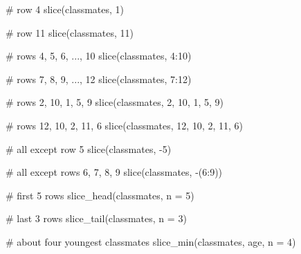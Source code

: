 \documentclass[
  letterpaper,
  DIV=11,
  numbers=noendperiod]{scrreprt}
\newenvironment{Shaded}{\begin{snugshade}}{\end{snugshade}}
\newcommand{\AttributeTok}[1]{\textcolor[rgb]{0.40,0.45,0.13}{#1}}
\newcommand{\CommentTok}[1]{\textcolor[rgb]{0.37,0.37,0.37}{#1}}
\newcommand{\DecValTok}[1]{\textcolor[rgb]{0.68,0.00,0.00}{#1}}
\newcommand{\FunctionTok}[1]{\textcolor[rgb]{0.28,0.35,0.67}{#1}}
\newcommand{\NormalTok}[1]{\textcolor[rgb]{0.00,0.23,0.31}{#1}}
\newcommand{\SpecialCharTok}[1]{\textcolor[rgb]{0.37,0.37,0.37}{#1}}
\begin{document}
\begin{tcolorbox}[enhanced jigsaw, colbacktitle=quarto-callout-tip-color!10!white, opacitybacktitle=0.6, breakable, left=2mm, leftrule=.75mm, toprule=.15mm, toptitle=1mm, bottomtitle=1mm, colframe=quarto-callout-tip-color-frame, opacityback=0, coltitle=black, arc=.35mm, titlerule=0mm, colback=white, bottomrule=.15mm, title=\textcolor{quarto-callout-tip-color}{\faLightbulb}\hspace{0.5em}{Answer}, rightrule=.15mm]

\begin{Shaded}
\begin{Highlighting}[]
\CommentTok{\# row 4}
\FunctionTok{slice}\NormalTok{(classmates, }\DecValTok{1}\NormalTok{)}

\CommentTok{\# row 11}
\FunctionTok{slice}\NormalTok{(classmates, }\DecValTok{11}\NormalTok{)}

\CommentTok{\# rows 4, 5, 6, ..., 10}
\FunctionTok{slice}\NormalTok{(classmates, }\DecValTok{4}\SpecialCharTok{:}\DecValTok{10}\NormalTok{)}

\CommentTok{\# rows 7, 8, 9, ..., 12}
\FunctionTok{slice}\NormalTok{(classmates, }\DecValTok{7}\SpecialCharTok{:}\DecValTok{12}\NormalTok{)}

\CommentTok{\# rows 2, 10, 1, 5, 9}
\FunctionTok{slice}\NormalTok{(classmates, }\DecValTok{2}\NormalTok{, }\DecValTok{10}\NormalTok{, }\DecValTok{1}\NormalTok{, }\DecValTok{5}\NormalTok{, }\DecValTok{9}\NormalTok{)}

\CommentTok{\# rows 12, 10, 2, 11, 6}
\FunctionTok{slice}\NormalTok{(classmates, }\DecValTok{12}\NormalTok{, }\DecValTok{10}\NormalTok{, }\DecValTok{2}\NormalTok{, }\DecValTok{11}\NormalTok{, }\DecValTok{6}\NormalTok{)}

\CommentTok{\# all except row 5}
\FunctionTok{slice}\NormalTok{(classmates, }\SpecialCharTok{{-}}\DecValTok{5}\NormalTok{)}

\CommentTok{\# all except rows 6, 7, 8, 9}
\FunctionTok{slice}\NormalTok{(classmates, }\SpecialCharTok{{-}}\NormalTok{(}\DecValTok{6}\SpecialCharTok{:}\DecValTok{9}\NormalTok{))}

\CommentTok{\# first 5 rows}
\FunctionTok{slice\_head}\NormalTok{(classmates, }\AttributeTok{n =} \DecValTok{5}\NormalTok{)}

\CommentTok{\# last 3 rows}
\FunctionTok{slice\_tail}\NormalTok{(classmates, }\AttributeTok{n =} \DecValTok{3}\NormalTok{)}

\CommentTok{\# about four youngest classmates}
\FunctionTok{slice\_min}\NormalTok{(classmates, age, }\AttributeTok{n =} \DecValTok{4}\NormalTok{)}


\end{Highlighting}
\end{Shaded}
\end{tcolorbox}
\end{document}
